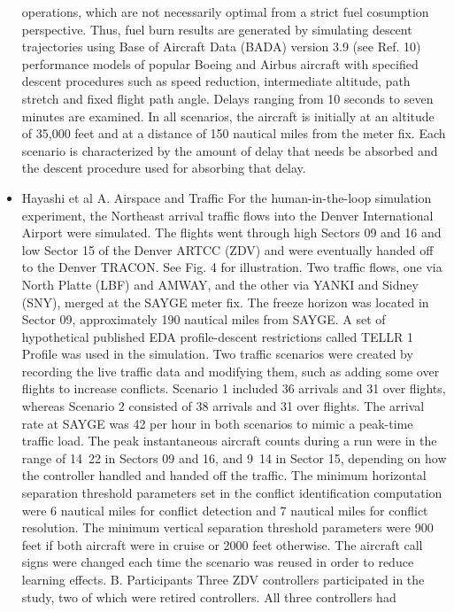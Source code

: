 \documentclass{aer1315-pretty}
\begin{document}
\begin{itemize}
operations, which are not necessarily optimal from a strict fuel cosumption perspective. Thus, fuel burn results are
generated by simulating descent trajectories using Base of Aircraft Data (BADA) version 3.9 (see Ref. 10)
performance models of popular Boeing and Airbus aircraft with specified descent procedures such as speed
reduction, intermediate altitude, path stretch and fixed flight path angle. Delays ranging from 10 seconds to seven
minutes are examined. In all scenarios, the aircraft is initially at an altitude of 35,000 feet and at a distance of 150
nautical miles from the meter fix. Each scenario is characterized by the amount of delay that needs be absorbed and
the descent procedure used for absorbing that delay.


\item Hayashi et al \cite{Hayashi:2011}
 A. Airspace and Traffic
    For the human-in-the-loop simulation experiment, the Northeast arrival traffic flows into the Denver
International Airport were simulated. The flights went through high Sectors 09 and 16 and low Sector 15 of the
Denver ARTCC (ZDV) and were eventually handed off to the Denver TRACON. See Fig. 4 for illustration. Two
traffic flows, one via North Platte (LBF) and AMWAY, and the other via YANKI and Sidney (SNY), merged at the
SAYGE meter fix. The freeze horizon was located in Sector 09, approximately 190 nautical miles from SAYGE. A
set of hypothetical published EDA profile-descent restrictions called TELLR 1 Profile was used in the simulation.
    Two traffic scenarios were created by recording the live traffic data and modifying them, such as adding some
over flights to increase conflicts. Scenario 1 included 36 arrivals and 31 over flights, whereas Scenario 2 consisted
of 38 arrivals and 31 over flights. The arrival rate at SAYGE was 42 per hour in both scenarios to mimic a peak-time
traffic load. The peak instantaneous aircraft counts during a run were in the range of 14~22 in Sectors 09 and 16,
and 9~14 in Sector 15, depending on how the controller handled and handed off the traffic. The minimum horizontal
separation threshold parameters set in the conflict identification computation were 6 nautical miles for conflict
detection and 7 nautical miles for conflict resolution. The minimum vertical separation threshold parameters were
900 feet if both aircraft were in cruise or 2000 feet otherwise. The aircraft call signs were changed each time the
scenario was reused in order to reduce learning effects.
B. Participants
    Three ZDV controllers participated in the study, two of which were retired controllers. All three controllers had

\end{itemize}
\end{document}
